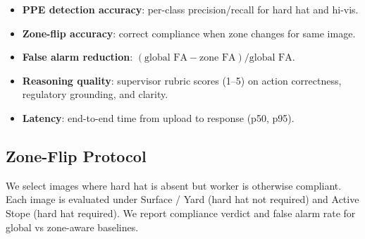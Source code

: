 \begin{itemize}
  \item \textbf{PPE detection accuracy}: per-class precision/recall for hard hat and hi-vis.
  \item \textbf{Zone-flip accuracy}: correct compliance when zone changes for same image.
  \item \textbf{False alarm reduction}: $(\text{global FA} - \text{zone FA}) / \text{global FA}$.
  \item \textbf{Reasoning quality}: supervisor rubric scores (1--5) on action correctness, regulatory grounding, and clarity.
  \item \textbf{Latency}: end-to-end time from upload to response (p50, p95).
\end{itemize}

\subsection{Zone-Flip Protocol}

We select images where hard hat is absent but worker is otherwise compliant. Each image is evaluated under Surface / Yard (hard hat not required) and Active Stope (hard hat required). We report compliance verdict and false alarm rate for global vs zone-aware baselines.
